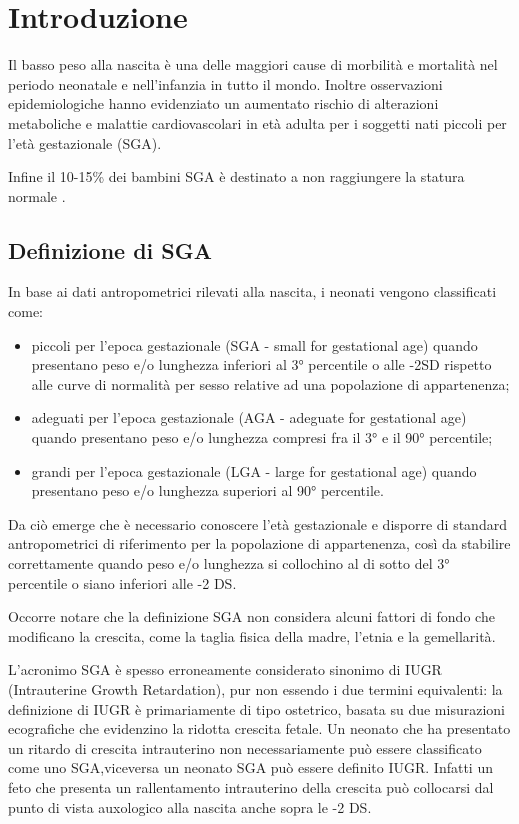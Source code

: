 \mainmatter

\chapter{Introduzione}
 
Il basso peso alla nascita \`e una delle maggiori cause di morbilit\`a e mortalit\`a
nel periodo neonatale e nell'infanzia in tutto il mondo.
Inoltre osservazioni epidemiologiche hanno evidenziato un aumentato rischio di 
alterazioni metaboliche e malattie cardiovascolari in età adulta per i soggetti nati piccoli 
per l'et\`a gestazionale (SGA)\cite{consensus}.

Infine il 10-15\% dei bambini SGA è destinato a non raggiungere la statura normale\cite{karlberg1995growth} \cite{leger1997reduced}.

\section{Definizione di SGA}

In base ai dati antropometrici rilevati alla nascita, i neonati vengono classificati come:
\begin{itemize}
\item piccoli per l'epoca gestazionale (SGA - small for gestational age) quando presentano peso e/o lunghezza inferiori al 3°
   percentile o alle -2SD rispetto alle curve di normalità per sesso relative ad una popolazione di appartenenza;
\item adeguati per l'epoca gestazionale (AGA - adeguate for gestational age) quando presentano peso e/o lunghezza compresi
   fra il 3° e il 90° percentile;
\item grandi per l'epoca gestazionale (LGA - large for gestational age) quando presentano peso e/o lunghezza superiori
   al 90° percentile\cite{sga-1}.
\end{itemize}

Da ciò emerge che è necessario conoscere l'età gestazionale e disporre di standard antropometrici di riferimento per la popolazione di appartenenza, così da stabilire correttamente quando peso e/o lunghezza si collochino al di sotto del 3° percentile o siano inferiori alle -2 DS.

 Occorre notare che la definizione SGA non considera alcuni fattori di fondo che modificano la crescita, come la taglia fisica della madre,
l'etnia e la gemellarit\`a\cite{consensus}.

L'acronimo SGA è spesso erroneamente considerato sinonimo di IUGR (Intrauterine Growth Retardation), pur non essendo i due termini
equivalenti: la definizione di IUGR è primariamente di tipo ostetrico, basata su due misurazioni ecografiche che evidenzino la ridotta crescita fetale.
Un neonato che ha presentato un ritardo di crescita intrauterino non necessariamente pu\`o essere classificato come uno SGA,viceversa un
neonato SGA pu\`o essere definito IUGR. Infatti un feto che presenta un rallentamento intrauterino della crescita può collocarsi dal punto di vista 
auxologico alla nascita anche sopra le -2 DS\cite{sga}.

